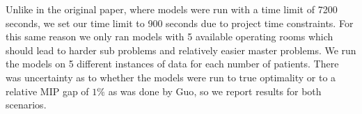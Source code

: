 Unlike in the original paper, where models were run with a time limit of 7200 seconds, we set our time limit to 900 seconds due to project time constraints. For this same reason we only ran models with 5 available operating rooms which should lead to harder sub problems and relatively easier master problems\cite{roshanaei2017propagating}. We run the models on 5 different instances of data for each number of patients. There was uncertainty as to whether the models were run to true optimality or to a relative MIP gap of $1\%$ as was done by Guo\cite{guo}, so we report results for both scenarios. 